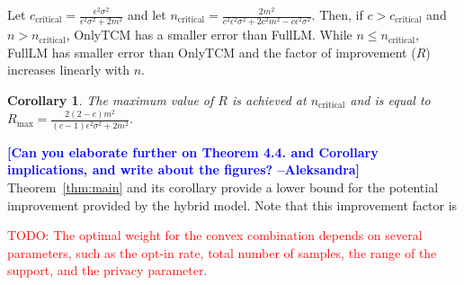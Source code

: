 \documentclass{article}
\newcommand{\ak}[1]{\textcolor{blue}{\bf\small [#1 --Aleksandra]}}
\newcommand\TODO[1]{\textcolor{red}{TODO: {#1}}}
\theoremstyle{plain}
\newtheorem*{cor}{Corollary}
\begin{document}
Let $c_{\text{critical}} = \frac{\epsilon^2 \sigma^2}{\epsilon^2 \sigma^2+2 m^2}$ and let $n_{\text{critical}} = \frac{2 m^2}{c^2 \epsilon^2 \sigma^2+2 c^2 m^2-c \epsilon^2 \sigma^2}.$ Then, if $c>c_{\text{critical}}$ and $n > n_{\text{critical}}$, OnlyTCM has a smaller error than FullLM. While $n \leq n_{\text{critical}}$, FullLM has smaller error than OnlyTCM and the factor of improvement ($R$) increases linearly with $n$. 

\begin{cor}
The maximum value of $R$ is achieved at $n_{\text{critical}}$ and is equal to $R_{\text{max}} = \frac{2 (2-c) m^2}{(c-1) \epsilon^2 \sigma^2+2 m^2}.$
\end{cor}

\ak{Can you elaborate further on Theorem 4.4. and Corollary implications, and write about the figures?}
Theorem~\ref{thm:main} and its corollary provide a lower bound for the potential improvement provided by the hybrid model. Note that this improvement factor is 

\TODO{The optimal weight for the convex combination depends on several parameters, such as the opt-in rate, total number of samples, the range of the support, and the privacy parameter.}
\end{document}
